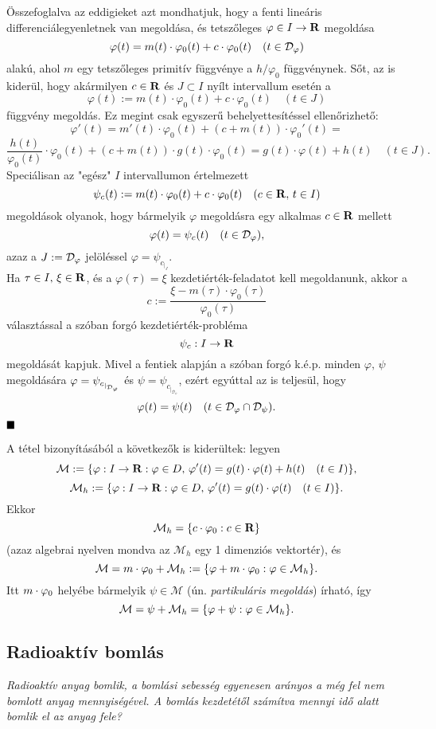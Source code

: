 Összefoglalva az eddigieket azt mondhatjuk, hogy a fenti lineáris differenciálegyenletnek van megoldása, és tetszőleges $\varphi \in I \to \mathbf{R}$ megoldása
\[
\varphi(t) = m(t) \cdot \varphi_0(t) + c \cdot \varphi_0(t) \quad (t \in \mathcal{D}_\varphi)
\]
alakú, ahol $m$ egy tetszőleges primitív függvénye a $h / \varphi_0$ függvénynek. Sőt, az is kiderül, hogy akármilyen $c \in \mathbf{R}$ és $J \subset I$ nyílt intervallum esetén a
\[
\varphi(t) := m(t) \cdot \varphi_0(t) + c \cdot \varphi_0(t) \quad (t \in J)
\]
függvény megoldás. Ez  megint csak egyszerű behelyettesítéssel ellenőrizhető:
\[
\varphi'(t) = m'(t) \cdot \varphi_0(t) + (c + m(t)) \cdot \varphi_0'(t) =
\]
\[
\frac{h(t)}{\varphi_0(t)} \cdot \varphi_0(t) + (c + m(t)) \cdot g(t) \cdot \varphi_0(t) = g(t) \cdot \varphi(t) + h(t) \quad (t \in J).
\]
Speciálisan az "egész" $I$ intervallumon értelmezett
\[
\psi_c(t) := m(t) \cdot \varphi_0(t) + c \cdot \varphi_0(t) \quad (c \in \mathbf{R}, \, t \in I)
\]
megoldások olyanok, hogy bármelyik $\varphi$ megoldásra egy alkalmas $c \in \mathbf{R}$ mellett
\[
\varphi(t) = \psi_c(t) \quad (t \in \mathcal{D}_\varphi),
\]
azaz a $J := \mathcal{D}_\varphi$ jelöléssel $\varphi = \psi_{c_{|_J}}$.\\

Ha $\tau \in I, \, \xi \in \mathbf{R}$, és a $\varphi(\tau) = \xi$ kezdetiérték-feladatot kell megoldanunk, akkor a
\[
c := \frac{\xi - m(\tau) \cdot \varphi_0(\tau)}{\varphi_0(\tau)}
\]
választással a szóban forgó kezdetiérték-probléma
\[
\psi_c : I \to \mathbf{R}
\]
megoldását kapjuk. Mivel a fentiek alapján a szóban forgó k.é.p. minden $\varphi, \, \psi$ megoldására $\varphi = \psi_{c_{|_{\mathcal{D}_\varphi}}}$ és $\psi = \psi_{c_{|_{\mathcal{D}_\psi}}}$, ezért egyúttal az is teljesül, hogy
\[
\varphi(t) = \psi(t) \quad (t \in \mathcal{D}_\varphi \cap \mathcal{D}_\psi).
\]
$\hfill \blacksquare$

A tétel bizonyításából a következők is kiderültek: legyen
\[
	\mathcal{M} := \{ \varphi : I \to \mathbf{R} : \varphi \in D, \, \varphi'(t) = g(t) \cdot \varphi(t) + h(t) \quad (t \in I) \},
\]
\[
	\mathcal{M}_h := \{ \varphi : I \to \mathbf{R} : \varphi \in D, \, \varphi'(t) = g(t) \cdot \varphi(t) \quad (t \in I) \}.
\]
Ekkor
\[
	\mathcal{M}_h = \{ c \cdot \varphi_0 : c \in \mathbf{R} \}
\]
(azaz algebrai nyelven mondva az $\mathcal{M}_h$ egy 1 dimenziós vektortér), és
\[
	\mathcal{M} = m \cdot \varphi_0 + \mathcal{M}_h := \{ \varphi + m \cdot \varphi_0 : \varphi \in \mathcal{M}_h \}.
\]
Itt $m \cdot \varphi_0$ helyébe bármelyik $\psi \in \mathcal{M}$ (ún. \textit{partikuláris megoldás}) írható, így
\[
	\mathcal{M} = \psi + \mathcal{M}_h = \{ \varphi + \psi : \varphi \in \mathcal{M}_h \}.
\]

\subsection{Radioaktív bomlás}
\textit{Radioaktív anyag bomlik, a bomlási sebesség egyenesen arányos a még fel nem bomlott anyag mennyiségével. A bomlás kezdetétől számítva mennyi idő alatt bomlik el az anyag fele?}\\

